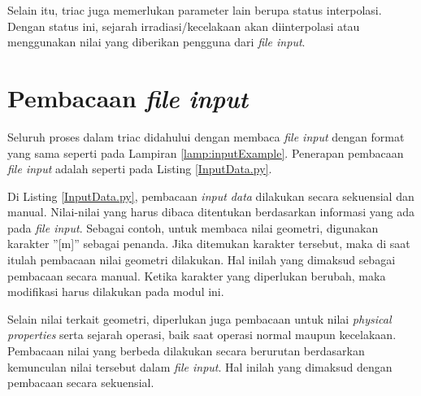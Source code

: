 \documentclass[a4paper,11pt]{report}
\begin{document}
Selain itu, triac juga memerlukan parameter lain berupa status interpolasi. Dengan status ini, sejarah irradiasi/kecelakaan akan diinterpolasi atau menggunakan nilai yang diberikan pengguna dari \textit{file input}.

\section{Pembacaan \textit{file input}}
\label{sec:fileinput}
Seluruh proses dalam triac didahului dengan membaca \textit{file input} dengan format yang sama seperti pada Lampiran \ref{lamp:inputExample}. Penerapan pembacaan \textit{file input} adalah seperti pada Listing \ref{InputData.py}.%

Di Listing \ref{InputData.py}, pembacaan \textit{input data} dilakukan secara sekuensial dan manual. Nilai-nilai yang harus dibaca ditentukan berdasarkan informasi yang ada pada \textit{file input}. Sebagai contoh, untuk membaca nilai geometri, digunakan karakter ''[m]'' sebagai penanda. Jika ditemukan karakter tersebut, maka di saat itulah pembacaan nilai geometri dilakukan. Hal inilah yang dimaksud sebagai pembacaan secara manual. Ketika karakter yang diperlukan berubah, maka modifikasi harus dilakukan pada modul ini.

Selain nilai terkait geometri, diperlukan juga pembacaan untuk nilai \textit{physical properties} serta sejarah operasi, baik saat operasi normal maupun kecelakaan. Pembacaan nilai yang berbeda dilakukan secara berurutan berdasarkan kemunculan nilai tersebut dalam \textit{file input}. Hal inilah yang dimaksud dengan pembacaan secara sekuensial.
\end{document}
